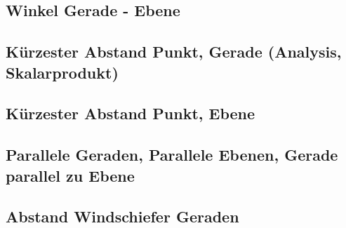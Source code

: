 \subsection{Winkel Gerade - Ebene}
\subsection{Kürzester Abstand Punkt, Gerade (Analysis, Skalarprodukt)}
\subsection{Kürzester Abstand Punkt, Ebene}
\subsection{Parallele Geraden, Parallele Ebenen, Gerade parallel zu Ebene}
\subsection{Abstand Windschiefer Geraden}







